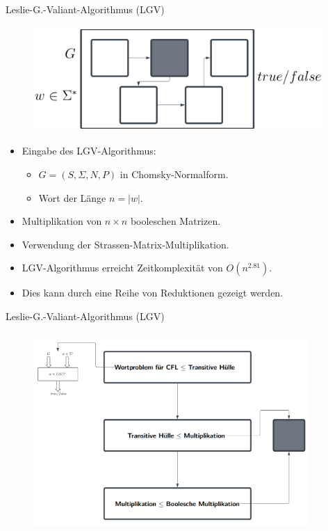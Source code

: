 \documentclass{beamer}
\begin{document}
	\begin{frame}{Leslie-G.-Valiant-Algorithmus (LGV)}
		\begin{figure}
			\centering
			\includegraphics[width=11cm,height=4cm]{img/LGVT}
		\end{figure}
		\begin{itemize}
			\item Eingabe des LGV-Algorithmus:
			\begin{itemize}
				\item $G = (S, \Sigma, N, P)$ in Chomsky-Normalform.
				\item Wort der Länge $n=|w|$.
			\end{itemize}
			\pause
			\item Multiplikation von $n \times n$ booleschen Matrizen.
			\item Verwendung der Strassen-Matrix-Multiplikation.
			\item LGV-Algorithmus erreicht Zeitkomplexität von $O(n^{2.81})$.
			\pause
			\item Dies kann durch eine Reihe von Reduktionen gezeigt werden.
		\end{itemize}
	\end{frame}

	\begin{frame}{Leslie-G.-Valiant-Algorithmus (LGV)}
		\begin{figure}
			\centering
			\includegraphics[width=10.5cm,height=7.5cm]{img/ZusammenfassungT}
		\end{figure}
	\end{frame}
\end{document}
